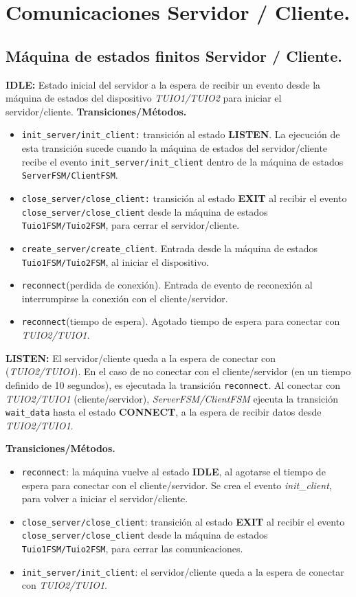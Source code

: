 \section{Comunicaciones Servidor / Cliente.}
\label{sec:comunicaciones}

\subsection{Máquina de estados finitos Servidor / Cliente.}

\textbf{IDLE:} Estado inicial del servidor a la espera de recibir un evento desde la máquina de estados del dispositivo \emph{TUIO1/TUIO2} para iniciar el servidor/cliente.
\textbf{Transiciones/Métodos.}
\begin{itemize}
\item \texttt{init\_server/init\_client:} transición al estado \textbf{LISTEN}. La ejecución de esta transición sucede cuando la máquina de estados del servidor/cliente recibe el evento \texttt{init\_server/init\_client} dentro de la máquina de estados \texttt{ServerFSM/ClientFSM}.

\item \texttt{close\_server/close\_client:} transición al estado \textbf{EXIT} al recibir el evento \texttt{close\_server/close\_client} desde la máquina de estados \texttt{Tuio1FSM/Tuio2FSM}, para cerrar el servidor/cliente.
\item \texttt{create\_server/create\_client}. Entrada desde la máquina de estados \texttt{Tuio1FSM/Tuio2FSM}, al iniciar el dispositivo.
\item \texttt{reconnect}(perdida de conexión). Entrada de evento de reconexión al interrumpirse la conexión con el cliente/servidor.
\item \texttt{reconnect}(tiempo de espera). Agotado tiempo de espera para conectar con \emph{TUIO2/TUIO1}.
\end{itemize}

\textbf{LISTEN:} El servidor/cliente queda a la espera de conectar con (\emph{TUIO2/TUIO1}). En el caso de no conectar con el cliente/servidor (en un tiempo definido de 10 segundos), es ejecutada la transición \texttt{reconnect}. 
Al conectar con \emph{TUIO2/TUIO1} (cliente/servidor), \emph{ServerFSM/ClientFSM} ejecuta la transición \texttt{wait\_data} hasta el estado \textbf{CONNECT}, a la espera de recibir datos desde \emph{TUIO2/TUIO1}.

\textbf{Transiciones/Métodos.}
\begin{itemize}
\item \texttt{reconnect}: la máquina vuelve al estado \textbf{IDLE}, al agotarse el tiempo de espera para conectar con el cliente/servidor. Se crea el evento \emph{init\_client}, para volver a iniciar el servidor/cliente.
\item \texttt{close\_server/close\_client}: transición al estado \textbf{EXIT} al recibir el evento \texttt{close\_server/close\_client} desde la máquina de estados \texttt{Tuio1FSM/Tuio2FSM}, para cerrar las comunicaciones.
\item \texttt{init\_server/init\_client}: el servidor/cliente queda a la espera de conectar con \emph{TUIO2/TUIO1}.
\end{itemize}


